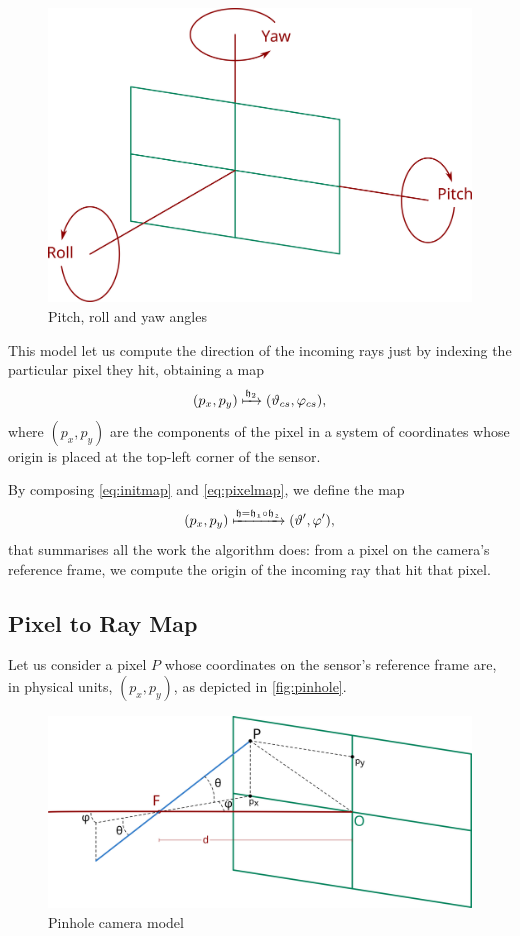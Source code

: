 \begin{figure}[bth]
	\myfloatalign
	\includegraphics[width=.8\linewidth]{gfx/rollpitchyaw.png}
	\caption[Pitch, roll and yaw angles]{Pitch, roll and yaw angles}
	\label{fig:pitchrollyaw}
\end{figure}

This model let us compute the direction of the incoming rays just by indexing the particular pixel they hit, obtaining a map
\begin{equation}
	\label{eq:pixelmap}
	(p_x, p_y) \xmapsto{\mathfrak{h}_2} (\vartheta_{cs}, \varphi_{cs}),
\end{equation}
where $(p_x, p_y)$ are the components of the pixel in a system of coordinates whose origin is placed at the top-left corner of the sensor.

By composing \autoref{eq:initmap} and \autoref{eq:pixelmap}, we define the map
\begin{equation}
	(p_x, p_y) \xmapsto{\mathfrak{h} = \mathfrak{h_1}\circ\mathfrak{h_2}} (\vartheta', \varphi'),
\end{equation}
that summarises all the work the algorithm does: from a pixel on the camera's reference frame, we compute the origin of the incoming ray that hit that pixel.

\subsection{Pixel to Ray Map}
\label{subcsec:pixeltoray}

Let us consider a pixel $P$ whose coordinates on the sensor's reference frame are, in physical units, $(p_x, p_y)$, as depicted in \autoref{fig:pinhole}.

\begin{figure}[bth]
	\myfloatalign
	\includegraphics[width=.8\linewidth]{gfx/pinhole.png}
	\caption[Pinhole camera model]{Pinhole camera model}
	\label{fig:pinhole}
\end{figure}

